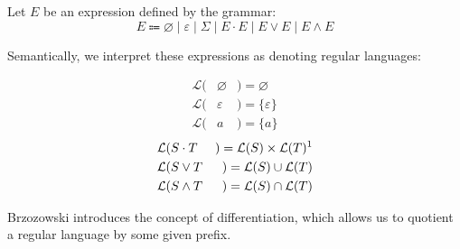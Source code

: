 \documentclass[sigplan,review,acmsmall,nonacm,screen,anonymous]{acmart}\settopmatter{printfolios=false,printccs=false,printacmref=false}
\begin{document}
  \begin{definition}
    Let \( E \) be an expression defined by the grammar:
    \[
      E \Coloneqq \varnothing \mid \varepsilon \mid \Sigma \mid E \cdot E \mid E \lor E \mid E \land E
    \]

    Semantically, we interpret these expressions as denoting regular languages:
    \setlength{\columnseprule}{0pt}
    \setlength{\columnsep}{-3cm}
    \begin{multicols}{2}
      \begin{eqnarray*}
        \mathcal{L}(& \varnothing & ) = \varnothing \\
        \mathcal{L}(& \varepsilon & ) = \{\varepsilon\} \\
        \mathcal{L}(& a           & ) = \{a\}
      \end{eqnarray*} \break\vspace{-0.45cm}
      \begin{eqnarray*}
        \mathcal{L}(& S\cdot T & ) = \mathcal{L}(S) \times \mathcal{L}(T)\text{\footnotemark}\\
        \mathcal{L}(& S\vee  T & ) = \mathcal{L}(S) \cup \mathcal{L}(T)\\
        \mathcal{L}(& S\land T & ) = \mathcal{L}(S) \cap \mathcal{L}(T)
      \end{eqnarray*}
    \end{multicols}
  \end{definition}

  Brzozowski introduces the concept of differentiation, which allows us to quotient a regular language by some given prefix.
\end{document}
